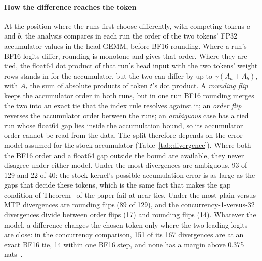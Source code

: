 \paragraph{How the difference reaches the token} At the position where the runs first choose differently, with competing tokens $a$ and $b$, the analysis compares in each run the order of the two tokens' FP32 accumulator values in the head GEMM, before BF16 rounding. Where a run's BF16 logits differ, rounding is monotone and gives that order. Where they are tied, the float64 dot product of that run's head input with the two tokens' weight rows stands in for the accumulator, but the two can differ by up to $\gamma(A_a+A_b)$, with $A_t$ the sum of absolute products of token $t$'s dot product. A \emph{rounding flip} keeps the accumulator order in both runs, but in one run BF16 rounding merges the two into an exact tie that the index rule resolves against it; an \emph{order flip} reverses the accumulator order between the runs; an \emph{ambiguous} case has a tied run whose float64 gap lies inside the accumulation bound, so its accumulator order cannot be read from the data. The split therefore depends on the error model assumed for the stock accumulator (Table~\ref{tab:divergence}). Where both the BF16 order and a float64 gap outside the bound are available, they never disagree under either model. Under the \modelcons{} most divergences are ambiguous, 93 of 129 and 22 of 40: the stock kernel's possible accumulation error is as large as the gaps that decide these tokens, which is the same fact that makes the gap condition of Theorem~ of the paper fail at near ties. Under the \modelhopper{} most plain-versus-MTP divergences are rounding flips (89 of 129), and the concurrency-1-versus-32 divergences divide between order flips (17) and rounding flips (14). Whatever the model, a difference changes the chosen token only where the two leading logits are close: in the concurrency comparison, 151 of its 167 divergences are at an exact BF16 tie, 14 within one BF16 step, and none has a margin above 0.375 nats~.

